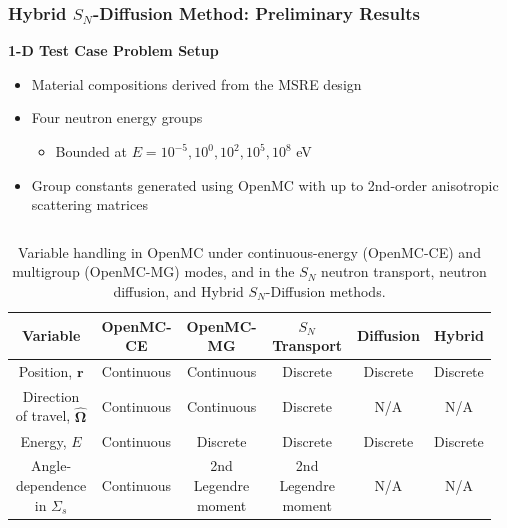 \begin{frame}
  \frametitle{Hybrid $S_N$-Diffusion Method: Preliminary Results}
  \textbf{1-D Test Case Problem Setup}
  \begin{itemize}
    \item Material compositions derived from the MSRE design
    \item Four neutron energy groups
      \begin{itemize}
        \item Bounded at $E=10^{-5}, 10^0, 10^2, 10^5, 10^8$ eV
      \end{itemize}
    \item Group constants generated using OpenMC with up to 2nd-order anisotropic scattering
      matrices
  \end{itemize}
  \begin{columns}
    \column{12cm}
  \begin{table}
    \centering
    \scriptsize
    \caption{Variable handling in OpenMC under continuous-energy (OpenMC-CE) and multigroup
    (OpenMC-MG) modes, and in the $S_N$ neutron transport, neutron diffusion, and Hybrid
    $S_N$-Diffusion methods. }
    \begin{tabular}{c c c c c c}
      \toprule
      Variable & OpenMC-CE & OpenMC-MG & $S_N$ Transport & Diffusion & Hybrid \\
      \midrule
      Position, $\bm{r}$ & Continuous & Continuous & Discrete & Discrete & Discrete \\
      Direction of travel, $\bm{\hat{\Omega}}$ & Continuous & Continuous & Discrete & N/A & N/A \\
      Energy, $E$ & Continuous & Discrete & Discrete & Discrete & Discrete \\
      Angle-dependence in $\Sigma_s$ & Continuous & 2nd Legendre moment & 2nd Legendre moment
      & N/A & N/A \\
      \bottomrule
    \end{tabular}
    \label{table:var}
  \end{table}
  \end{columns}
\end{frame}

